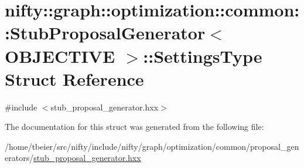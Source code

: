 \hypertarget{structnifty_1_1graph_1_1optimization_1_1common_1_1StubProposalGenerator_1_1SettingsType}{}\section{nifty\+:\+:graph\+:\+:optimization\+:\+:common\+:\+:Stub\+Proposal\+Generator$<$ O\+B\+J\+E\+C\+T\+I\+V\+E $>$\+:\+:Settings\+Type Struct Reference}
\label{structnifty_1_1graph_1_1optimization_1_1common_1_1StubProposalGenerator_1_1SettingsType}


{\ttfamily \#include $<$stub\+\_\+proposal\+\_\+generator.\+hxx$>$}



The documentation for this struct was generated from the following file\+:\begin{DoxyCompactItemize}
\item 
/home/tbeier/src/nifty/include/nifty/graph/optimization/common/proposal\+\_\+generators/\hyperlink{stub__proposal__generator_8hxx}{stub\+\_\+proposal\+\_\+generator.\+hxx}\end{DoxyCompactItemize}
